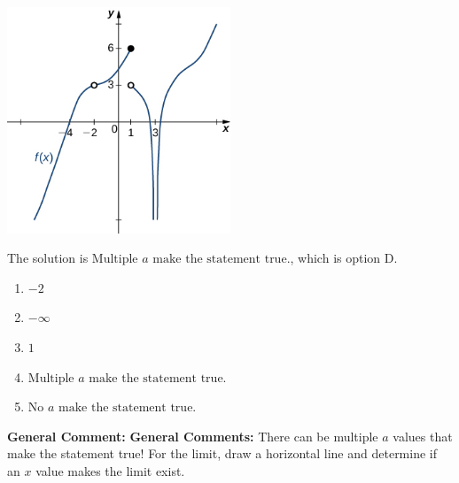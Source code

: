 \documentclass{extbook}[14pt]
\begin{document}
\begin{enumerate}
{\begin{center}
    \includegraphics[width=0.5\textwidth]{../Figures/evaluateLimitGraphicallyCopyA.png}
\end{center}


The solution is \( \text{Multiple } a \text{ make the statement true}. \), which is option D.\begin{enumerate}[label=\Alph*.]
\item \( -2 \)


\item \( -\infty \)


\item \( 1 \)


\item \( \text{Multiple } a \text{ make the statement true}. \)


\item \( \text{No } a \text{ make the statement true}. \)


\end{enumerate}

\textbf{General Comment:} \textbf{General Comments:} There can be multiple $a$ values that make the statement true! For the limit, draw a horizontal line and determine if an $x$ value makes the limit exist.
}
\end{enumerate}
\end{document}
